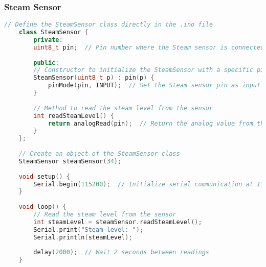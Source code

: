 \subsubsection*{Steam Sensor}
\begin{lstlisting}[language=C++]
	// Define the SteamSensor class directly in the .ino file
	class SteamSensor {
		private:
		uint8_t pin;  // Pin number where the Steam sensor is connected
		
		public:
		// Constructor to initialize the SteamSensor with a specific pin
		SteamSensor(uint8_t p) : pin(p) {
			pinMode(pin, INPUT);  // Set the Steam sensor pin as input
		}
		
		// Method to read the steam level from the sensor
		int readSteamLevel() {
			return analogRead(pin);  // Return the analog value from the sensor
		}
	};
	
	// Create an object of the SteamSensor class
	SteamSensor steamSensor(34);
	
	void setup() {
		Serial.begin(115200);  // Initialize serial communication at 115200 baud rate
	}
	
	void loop() {
		// Read the steam level from the sensor
		int steamLevel = steamSensor.readSteamLevel();
		Serial.print("Steam level: ");
		Serial.println(steamLevel);
		
		delay(2000);  // Wait 2 seconds between readings
	}
\end{lstlisting}
\clearpage
